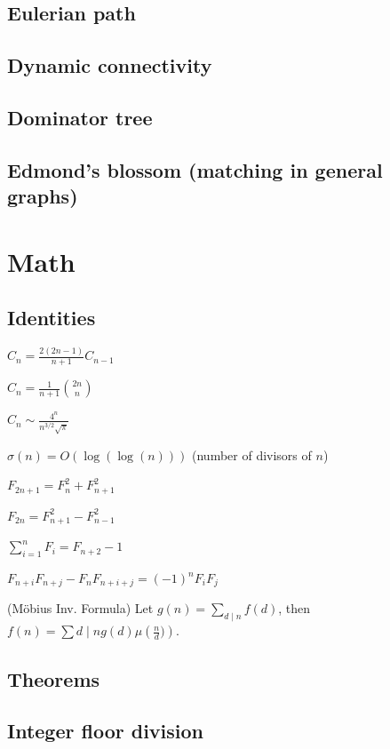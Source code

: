 \subsection{Eulerian path}
\subsection{Dynamic connectivity}
\subsection{Dominator tree}
\subsection{Edmond's blossom (matching in general graphs)}

\section{Math}
\subsection{Identities}
{
	$C_n = \frac{2(2n-1)}{n+1} C_{n-1}$

	$C_n = \frac{1}{n+1} \binom{2n}{n}$

	$C_n \sim \frac{4^n}{n^{3/2}\sqrt{\pi}}$

	$\sigma(n) = O(\log(\log(n)))$ (number of divisors of $n$)

	$F_{2n+1} = F_{n}^2 + F_{n+1}^2$

	$F_{2n} = F_{n+1}^2 - F_{n-1}^2$

	$\sum_{i=1}^n F_i = F_{n+2}-1$

	$F_{n+i}F_{n+j} - F_nF_{n+i+j} = (-1)^n F_iF_j$

	(Möbius Inv. Formula)
	Let $g(n) = \sum_{d\mid n} f(d)$, then $f(n)=\sum{d\mid n} g(d) \mu\left(\frac{n}{d})\right)$.
}
\subsection{Theorems}
\subsection{Integer floor division}
